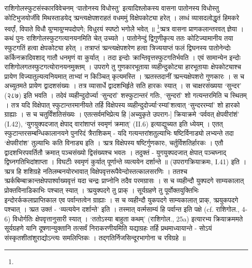 राशिगोलस्फुटसंस्कारविवेचनम् 
`पातोनस्य विधोस्तु' इत्यादिश्लोकस्य वासना 
पातोनस्य विधोस्तु कोटिभुजयोर्जीवे मिथस्ताडयेद् 
त्र्प्रन्त्यक्षेपशराहतं वधममुं विक्षेपकोट्या हरेत् । 
लव्धं व्यासदलोद्धृतं हिमकरे स्वर्एां, विपाते विधौ 
युग्मायुग्मपदोपगे; विधुरयं स्पष्टो भगोलेे भवेत् ॥
\footnote{}त्र्प्रत्र वासना प्राणकलान्तरवत् ज्ञेया । कथं पुनः राशिगोलस्फुटगत्यानयनमिति चेत् उच्यते । पातोनेन्दुं द्विगुणीकृत्य ततः कोटिज्यामानीय तया स्फुटगतिं हत्वा क्षेपकोट्या हरेत् । तत्राप्तं त्र्प्रन्त्यक्षेपशरेण हत्वा त्रिज्ययाप्तं फलं द्विघनस्य पातोनेन्दोः कर्किनक्रादिवशाद् गातौ धनमृणं वा कुर्यात् । तदा इन्दोः क्रान्तिवृत्तस्फुटगतिर्भवति । एवं सामान्येन इन्दोः राशिगोलगतस्फुटगत्योरानयनमुक्तम् ।
उपरागे तु गुणकारभूताया व्यहीन्दुकोट्या हारभूतायाः क्षेपकोट्याश्च प्रायेण विज्यातुल्यत्वनियमात् ताभ्यां न किञ्चित् कृत्यमस्ति । त्र्प्रतस्तदानीं त्र्प्रन्त्यक्षेपशरो गुणकारः । स च अच्युतमते प्रायेण द्वादशसंख्यः । तत्र व्यासार्धे द्वादशभिर्हृते सति हारकः स्यात् । स चाक्षरसंख्यया `सुन्दर' (२८७) इति भवति । तदेवं व्यहीन्दुदोर्ज्या `सुन्दरां' शस्फुटान्तरं गतिः, `सुन्दरां' शो गत्यन्तरमिति च स्थितम् ।
तत्र यदि विक्षेपात् स्फुटान्तरमानीयते तर्हि विक्षेपस्य व्यहीन्दुदोर्ज्या`रम्यां'शत्वात् `सुन्दररम्यां' शो हारको ग्राह्याः । स च चतुर्विंशतिसंख्यः । एतत्सर्वमभिप्रेत्य हि [अच्युकृते उपराग-] क्रियाक्रमे `पर्ववत् क्षेपवीरांशं' (I.42), `युगयुक्पदजात् क्षेपाद् वारांशाप्तं स्वमृणं क्रमात्' (II.6) इत्याद्युच्यत इति ध्येयम् ।
एतत् स्फुटान्तरसम्बन्धिकालानयने पुनरिदं त्रैराशिकम् - यदि गत्यन्तरांशतुल्याभिः षष्टिर्विनाड्यो लभ्यन्ते तदा `क्षेपवीरांश' तुल्याभिः कति विनाड्य इति । त्र्प्रत्र विक्षेपस्य षष्टिर्गुणकारः, चर्तुर्विशतिर्हारकः । एतौ द्वादशभिरपवर्तितौ क्रमात् पञ्चसंख्यो द्विसंख्यश्च भवतः । तदुक्तं -
युगयुक्पदजात् क्षेपात् पञ्चघ्नाद् द्विघ्नगतिभिदांशाप्ता ।
विघटीः स्वमृणं कुर्यात् पूर्णान्ते व्यत्ययेन दर्शान्ते ॥ 
(उपरागक्रियाक्रमः, I.41)
इति । त्र्प्रत्र हि शशिग्रहे नतिलम्बनयोरभावात् विक्षेपवृत्तरूपैवेन्दोस्तत्कालसरणिः । ततश्च त्र्प्रर्कबिम्बाक्रान्तक्षेपपार्श्वाख्यवृत्तं यदा चन्द्रः प्राप्नोनि तदैव परमग्रासः । स च व्यहीन्दौ युक्पदगे साम्यकालात् प्रोक्तविनाडिकाभिः पश्चात् स्यात् । त्र्प्रयुक्पदगे तु प्राक् ।
सूर्यग्रहणे तु पूर्वोक्तयुक्तिभिः इन्दोरर्ककलाप्राप्तिकाल एव पर्वान्तत्वेन ग्राह्याः । स च व्यहीन्दौ युकपदगे साम्यकालात् प्राक्, त्र्प्रयुकपदगे पश्चात् । त्र्प्रत उक्तं - `व्यत्ययेन दर्शान्ते' इति । तस्मात् वर्त्मसाम्यं हि पर्वान्त इति पक्षे (cf. राशिगोल., 4-6) विधोर्गतिः क्षेपवृत्तानुसारी स्यात् । `ततोऽस्या बाहुता कथम्' (राशिगोल., 25a) इत्यारभ्य क्रियाक्रममते सूर्यग्रहणे यानि दूषणान्युक्तानि तत्सर्वं निराकरणीयमिति यद्याग्रहः तर्हि प्रथमाध्यायान्ते -
सोऽयं संस्कृतशीतांशुराद्योऽन्त्यः समलिप्तिकः ।
तद्गतिर्निजसिन्दूरभागोना च रविग्रहे ॥
